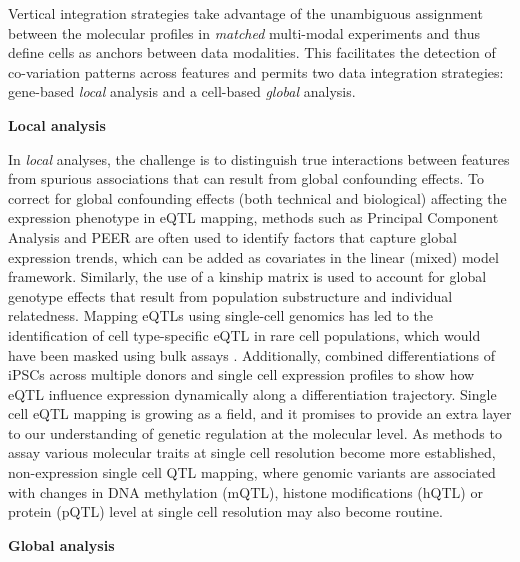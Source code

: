 Vertical integration strategies take advantage of the unambiguous assignment between the molecular profiles in \textit{matched} multi-modal experiments and thus define cells as anchors between data modalities. This facilitates the detection of co-variation patterns across features and permits two data integration strategies: gene-based \textit{local} analysis and a cell-based \textit{global} analysis.

\textbf{Local analysis}

In \textit{local} analyses, the challenge is to distinguish true interactions between features from spurious associations that can result from global confounding effects. To correct for global confounding effects (both technical and biological) affecting the expression phenotype in eQTL mapping, methods such as Principal Component Analysis and PEER \cite{Stegle2010} are often used to identify factors that capture global expression trends, which can be added as covariates in the linear (mixed) model framework. Similarly, the use of a kinship matrix is used to account for global genotype effects that result from population substructure and individual relatedness. Mapping eQTLs using single-cell genomics has led to the identification of cell type-specific eQTL in rare cell populations, which would have been masked using bulk assays \cite{VanDerWijst2018}. Additionally, \cite{Cuomo2020} combined differentiations of iPSCs across multiple donors and single cell expression profiles to show how eQTL influence expression dynamically along a differentiation trajectory. Single cell eQTL mapping is growing as a field, and it promises to provide an extra layer to our understanding of genetic regulation at the molecular level. As methods to assay various molecular traits at single cell resolution become more established, non-expression single cell QTL mapping, where genomic variants are associated with changes in DNA methylation (mQTL), histone modifications (hQTL) or protein (pQTL) level at single cell resolution may also become routine.

\textbf{Global analysis}


